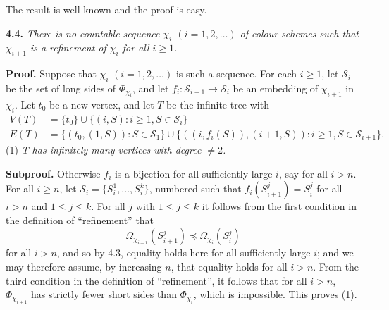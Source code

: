 The result is well-known and the proof is easy. 

\textbf{4.4.} \textit{There is no countable sequence $\chi_i$ $(i = 1, 2, \dots)$ of colour schemes such that $\chi_{i+1}$ is a refinement of $\chi_i$ for all $i \ge 1$.}

\textbf{Proof.} Suppose that $\chi_i$ $(i = 1, 2, \dots)$ is such a sequence. For each $i \ge 1$, let $\mathscr{S}_i$ be the set of long sides of $\Phi_{\chi_i}$, and let $f_i \colon \mathscr{S}_{i+1} \to \mathscr{S}_i$ be an embedding of $\chi_{i+1}$ in $\chi_i$. Let $t_0$ be a new vertex, and let $T$ be the infinite tree with
\begin{align*}
V(T) &= \{t_0\} \cup \{(i, S) : i \ge 1, S \in \mathscr{S}_i\} \\
E(T) &= \{(t_0, (1, S)) : S \in \mathscr{S}_1\} \cup \{((i, f_i(S)), (i+1, S)) : i \ge 1, S \in \mathscr{S}_{i+1}\}.
\end{align*}
\hspace*{12pt}(1) \textit{T has infinitely many vertices with degree $\ne 2$.}

\textbf{Subproof.} Otherwise $f_i$ is a bijection for all sufficiently large $i$, say for all $i > n$. For all $i \ge n$, let $\mathscr{S}_i = \{S_i^1, \dots, S_i^k\}$, numbered such that $f_i(S_{i+1}^j) = S_i^j$ for all $i > n$ and $1 \le j \le k$. For all $j$ with $1 \le j \le k$ it follows from the first condition in the definition of ``refinement'' that
\begin{equation*}
\Omega_{\chi_{i+1}}(S_{i+1}^j) \preccurlyeq \Omega_{\chi_i}(S_i^j)
\end{equation*}
for all $i > n$, and so by 4.3, equality holds here for all sufficiently large $i$; and we may therefore assume, by increasing $n$, that equality holds for all $i > n$. From the third condition in the definition of ``refinement'', it follows that for all $i > n$, $\Phi_{\chi_{i+1}}$ has strictly fewer short sides than $\Phi_{\chi_i}$, which is impossible. This proves (1).

